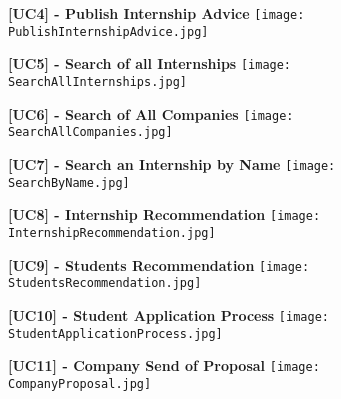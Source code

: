 			\begin{figure}[H]
				\centering
				{\bfseries [UC4] - Publish Internship Advice}
				\texttt{[image: PublishInternshipAdvice.jpg]}
				
			\end{figure}
			
		
			\begin{figure}[H]
				\centering
				{\bfseries [UC5] - Search of all Internships}
				\texttt{[image: SearchAllInternships.jpg]}
				
			\end{figure}
			
			\begin{figure}[H]
				\centering
				{\bfseries [UC6] - Search of All Companies}
				\texttt{[image: SearchAllCompanies.jpg]}
				
			\end{figure}
			
			\begin{figure}[H]
				\centering
				{\bfseries [UC7] - Search an Internship by Name}
				\texttt{[image: SearchByName.jpg]}
				
			\end{figure}
			
			\begin{figure}[H]
				\centering
				{\bfseries [UC8] - Internship Recommendation}
				\texttt{[image: InternshipRecommendation.jpg]}
				
			\end{figure}
			
			\begin{figure}[H]
				\centering
				{\bfseries [UC9] - Students Recommendation}
				\texttt{[image: StudentsRecommendation.jpg]}
				
			\end{figure}
			
			
			\begin{figure}[H]
				\centering
				{\bfseries [UC10] - Student Application Process}
				\texttt{[image: StudentApplicationProcess.jpg]}
				
			\end{figure}
			
			\begin{figure}[H]
				\centering
				{\bfseries [UC11] - Company Send of Proposal}
				\texttt{[image: CompanyProposal.jpg]}
				
			\end{figure}
			
